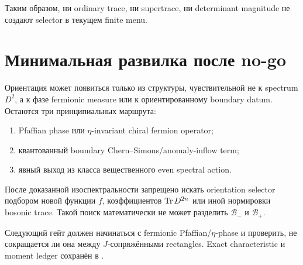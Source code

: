 Таким образом, ни ordinary trace, ни supertrace, ни determinant magnitude не
создают selector в текущем finite menu.

\section{Минимальная развилка после no-go}

Ориентация может появиться только из структуры, чувствительной не к spectrum
\(D^2\), а к фазе fermionic measure или к ориентированному boundary datum.
Остаются три принципиальных маршрута:
\begin{enumerate}
\item Pfaffian phase или \(\eta\)-invariant chiral fermion operator;
\item квантованный boundary Chern--Simons/anomaly-inflow term;
\item явный выход из класса вещественного even spectral action.
\end{enumerate}

\begin{nogocriterion}
После доказанной изоспектральности запрещено искать orientation selector
подбором новой функции \(f\), коэффициентов \(\operatorname{Tr} D^{2n}\) или иной
нормировки bosonic trace. Такой поиск математически не может разделить
\(\mathcal B_-\) и \(\mathcal B_+\).
\end{nogocriterion}

Следующий гейт должен начинаться с fermionic Pfaffian/\(\eta\)-phase и
проверить, не сокращается ли она между \(J\)-сопряжёнными rectangles.
Exact characteristic и moment ledger сохранён в
.